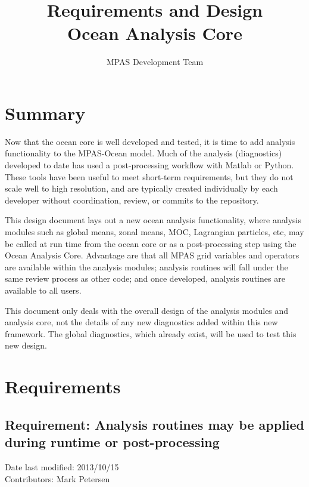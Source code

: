 \documentclass[11pt]{report}
\begin{document}
\title{
Requirements and Design\\
Ocean Analysis Core}
\author{MPAS Development Team}

\maketitle
\tableofcontents


\chapter{Summary}

Now that the ocean core is well developed and tested, it is time to add analysis functionality to the MPAS-Ocean model.  Much of the analysis (diagnostics) developed to date has used a post-processing workflow with Matlab or Python.  These tools have been useful to meet short-term requirements, but they do not scale well to high resolution, and are typically created individually by each developer without coordination, review, or commits to the repository.

This design document lays out a new ocean analysis functionality, where analysis modules such as global means, zonal means, MOC, Lagrangian particles, etc, may be called at run time from the ocean core or as a post-processing step using the Ocean Analysis Core.  Advantage are that all MPAS grid variables and operators are available within the analysis modules; analysis routines will fall under the same review process as other code; and once developed, analysis routines are available to all users.

This document only deals with the overall design of the analysis modules and analysis core, not the details of any new diagnostics added within this new framework.  The global diagnostics, which already exist, will be used to test this new design. 


\chapter{Requirements}

\section{Requirement: Analysis routines may be applied during runtime or post-processing}
Date last modified: 2013/10/15 \\
Contributors: Mark Petersen \\
\end{document}
